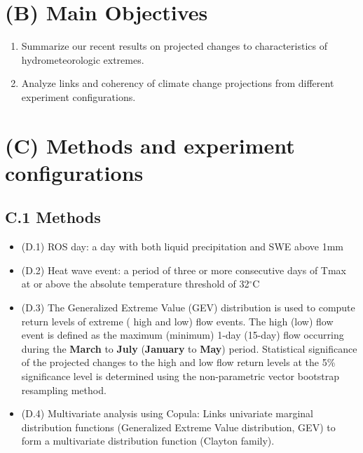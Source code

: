 \documentclass[a0,landscape]{a0poster}
\begin{document}
\begin{multicols*}{4}
\section*{(B) Main Objectives}
\begin{tcolorbox}[colback=white,colframe=green!40!black]
  \color{DarkSlateGray}
  \begin{enumerate}
    \item Summarize our recent results on projected changes to characteristics of hydrometeorologic extremes.
    \item Analyze links and coherency of climate change projections from different experiment configurations.
  \end{enumerate}
\end{tcolorbox}


\section*{(C) Methods and experiment configurations}
\subsection*{C.1 Methods}
%
\begin{itemize}
  \item (D.1) ROS day:  a day with both liquid precipitation and SWE above 1mm
  \item (D.2) Heat wave event: a period of three or more consecutive days of Tmax at or above the absolute temperature threshold of 32$^\circ$C
  \item (D.3) The Generalized Extreme Value (GEV) distribution is used to compute return
        levels of extreme ({\color{red} high} and {\color{blue}low}) flow events. The {\color{red} high} ({\color{blue}low}) flow event is
        defined as the maximum (minimum) 1-day (15-day) flow occurring during the \textbf{March}
        to \textbf{July} (\textbf{January} to \textbf{May}) period. Statistical significance of the projected
        changes to the {\color{red} high} and {\color{blue}low} flow return levels at the 5\%
        significance level is determined using the non-parametric vector bootstrap
        resampling method.
  \item (D.4) Multivariate analysis using Copula: Links univariate marginal distribution
         functions (Generalized Extreme Value distribution, GEV) to form a multivariate
        distribution function (Clayton family).
\end{itemize}


\end{multicols*}
\end{document}
